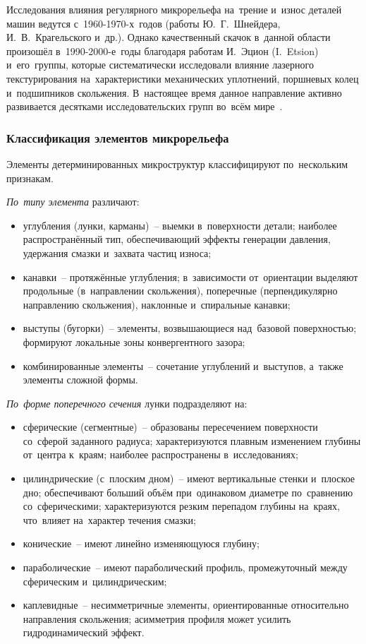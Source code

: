 Исследования влияния регулярного микрорельефа на~трение и~износ деталей машин ведутся с~1960-1970-х~годов (работы Ю.~Г.~Шнейдера, И.~В.~Крагельского и~др.). Однако качественный скачок в~данной области произошёл в~1990-2000-е~годы благодаря работам И.~Эцион (I.~Etsion) и~его~группы, которые систематически исследовали влияние лазерного текстурирования на~характеристики механических уплотнений, поршневых колец и~подшипников скольжения. В~настоящее время данное направление активно развивается десятками исследовательских групп во~всём мире~\cite{senatore2018,joshi2018,vladescu2019}.

\subsubsection{Классификация элементов микрорельефа}

Элементы детерминированных микроструктур классифицируют по~нескольким признакам.

\textit{По~типу элемента} различают:
\begin{itemize}
\item углубления (лунки, карманы)~-- выемки в~поверхности детали; наиболее распространённый тип, обеспечивающий эффекты генерации давления, удержания смазки и~захвата частиц износа;
\item канавки~-- протяжённые углубления; в~зависимости от~ориентации выделяют продольные (в~направлении скольжения), поперечные (перпендикулярно направлению скольжения), наклонные и~спиральные канавки;
\item выступы (бугорки)~-- элементы, возвышающиеся над~базовой поверхностью; формируют локальные зоны конвергентного зазора;
\item комбинированные элементы~-- сочетание углублений и~выступов, а~также элементы сложной формы.
\end{itemize}

\textit{По~форме поперечного сечения} лунки подразделяют на:
\begin{itemize}
\item сферические (сегментные)~-- образованы пересечением поверхности со~сферой заданного радиуса; характеризуются плавным изменением глубины от~центра к~краям; наиболее распространены в~исследованиях;
\item цилиндрические (с~плоским дном)~-- имеют вертикальные стенки и~плоское дно; обеспечивают больший объём при~одинаковом диаметре по~сравнению со~сферическими; характеризуются резким перепадом глубины на~краях, что~влияет на~характер течения смазки;
\item конические~-- имеют линейно изменяющуюся глубину;
\item параболические~-- имеют параболический профиль, промежуточный между сферическим и~цилиндрическим;
\item каплевидные~-- несимметричные элементы, ориентированные относительно направления скольжения; асимметрия профиля может усилить гидродинамический эффект.
\end{itemize}

